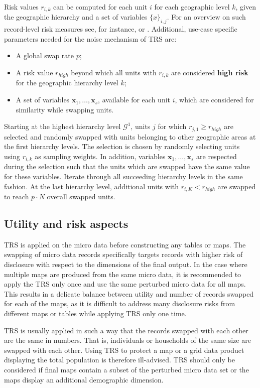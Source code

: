 Risk values $r_{i,k}$ can be computed for each unit $i$ for each geographic level $k$, given the geographic hierarchy and a set of variables $\{x\}_{i,j}$.
For an overview on such record-level risk measures see, for instance, \citet{GregoryOfer2011} or \citet{Skinner2009}.
Additional, use-case specific parameters needed for the noise mechanism of TRS are:
\begin{itemize}
  \item A global swap rate $p$;
  \item A risk value $r_{high}$ beyond which all units with $r_{i,k}$ are considered \textbf{high risk} for the geographic hierarchy level $k$;
  \item A set of variables $\mathbf{x}_1,\ldots,\mathbf{x}_s$, available for each unit $i$, which are considered for similarity while swapping units. 
\end{itemize}

Starting at the highest hierarchy level $\mathcal{G}^{1}$, units $j$ for which $r_{j,1} \geq r_{high}$ are selected and randomly swapped with units belonging to other geographic areas at the first hierarchy levels.
The selection is chosen by randomly selecting units using $r_{i,k}$ as sampling weights. In addition, variables $\mathbf{x}_1,\ldots,\mathbf{x}_s$ are respected during the selection such that the units which are swapped have the same value for these variables.
Iterate through all succeeding hierarchy levels in the same fashion. At the last hierarchy level, additional units with $r_{i,K} < r_{high}$ are swapped to reach $p\cdot N$ overall swapped units.



\subsection{Utility and risk aspects}

TRS is applied on the micro data before constructing any tables or maps. The swapping of micro data records specifically targets records with higher risk of disclosure with respect to the dimensions of the final output.
In the case where multiple maps are produced from the same micro data, it is recommended to apply the TRS only once and use the same perturbed micro data for all maps. This results in a delicate balance between utility and number of records swapped for each of the maps, as it is difficult to address many disclosure risks from different maps or tables while applying TRS only one time. 

TRS is usually applied in such a way that the records swapped with each other are the same in numbers. That is, individuals or households of the same size are swapped with each other. Using TRS to protect a map or a grid data product displaying the total population is therefore ill-advised. TRS should only be considered if final maps contain a subset of the perturbed micro data set or the maps display an additional demographic dimension.  


